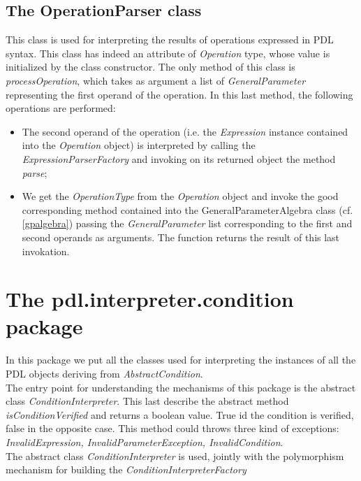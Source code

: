 \documentclass[a4paper,11pt] {ivoa}
\begin{document}
\subsection{The OperationParser class}\label{operationParser}
This class is used for interpreting the results of operations expressed in PDL syntax. 
This class has indeed an attribute of {\it Operation} type, whose value is initialized by the class constructor. The only method of this class is {\it processOperation}, which takes as argument a list of {\it GeneralParameter} representing the first operand of the operation. In this last method, the following operations are performed:
\begin{itemize}
\item The second operand of the operation (i.e. the {\it Expression} instance contained into the {\it Operation} object) is interpreted by calling the {\it ExpressionParserFactory} and invoking on its returned object the method {\it parse};
\item We get the {\it OperationType} from the  {\it Operation} object and invoke the good corresponding method contained into the {GeneralParameterAlgebra} class (cf. \ref{gpalgebra})  passing the {\it GeneralParameter} list corresponding to the first and second operands as arguments. The function returns the result of this last invokation.
\end{itemize}

\section{The pdl.interpreter.condition package}
In this package we put all the classes used for interpreting the instances of all the PDL objects deriving from {\it AbstractCondition}.\\
The entry point for understanding the mechanisms of this package is the abstract class {\it ConditionInterpreter}. This last describe the abstract method
{\it isConditionVerified} and returns a boolean value. True id the condition is verified, false in the opposite case. This method could throws three kind of exceptions: {\it InvalidExpression,  InvalidParameterException, InvalidCondition}.\\
The abstract class {\it ConditionInterpreter} is used, jointly with the polymorphism mechanism for building the {\it ConditionInterpreterFactory}
\end{document}

